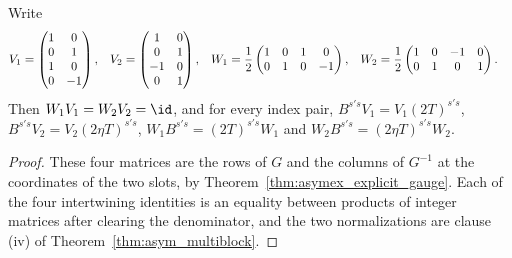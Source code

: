 \begin{theorem}
    \label{thm:asymex_kw_intertwiners}
    \leanok
    Write
    \begin{align}
        V_1 & =\begin{pmatrix}
                   1 & 0  \\
                   0 & 1  \\
                   1 & 0  \\
                   0 & -1
               \end{pmatrix},
            & V_2
            & =\begin{pmatrix}
                   1  & 0 \\
                   0  & 1 \\
                   -1 & 0 \\
                   0  & 1
               \end{pmatrix},
            & W_1
            & =\frac12\begin{pmatrix}
                          1 & 0 & 1 & 0  \\
                          0 & 1 & 0 & -1
                      \end{pmatrix},
            & W_2
            & =\frac12\begin{pmatrix}
                          1 & 0 & -1 & 0 \\
                          0 & 1 & 0  & 1
                      \end{pmatrix}.
        \notag
    \end{align}
    Then $W_1V_1=W_2V_2=\id$, and for every index pair,
    $B^{s's}V_1=V_1(2T)^{s's}$, $B^{s's}V_2=V_2(2\eta T)^{s's}$,
    $W_1B^{s's}=(2T)^{s's}W_1$ and $W_2B^{s's}=(2\eta T)^{s's}W_2$.
\end{theorem}

\begin{proof}
    \leanok
    These four matrices are the rows of $G$ and the columns of $G^{-1}$ at
    the coordinates of the two slots, by
    Theorem~\ref{thm:asymex_explicit_gauge}. Each of the four intertwining
    identities is an equality between products of integer matrices after
    clearing the denominator, and the two normalizations are clause (iv) of
    Theorem~\ref{thm:asym_multiblock}.
\end{proof}

